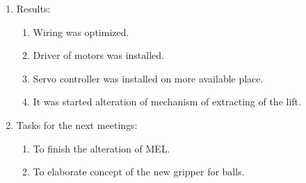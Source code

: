 \begin{enumerate}
	\item Results: 
	\begin{enumerate}
		\item Wiring was optimized.
		
		\item Driver of motors was installed.
		
		\item Servo controller was installed on more available place.
		
		\item It was started alteration of mechanism of extracting of the lift.
		
	\end{enumerate}
	
	\item Tasks for the next meetings:
	\begin{enumerate}
		\item To finish the alteration of MEL.
		
		\item To elaborate concept of the new gripper for balls.
		
	\end{enumerate}     
\end{enumerate}
\fillpage